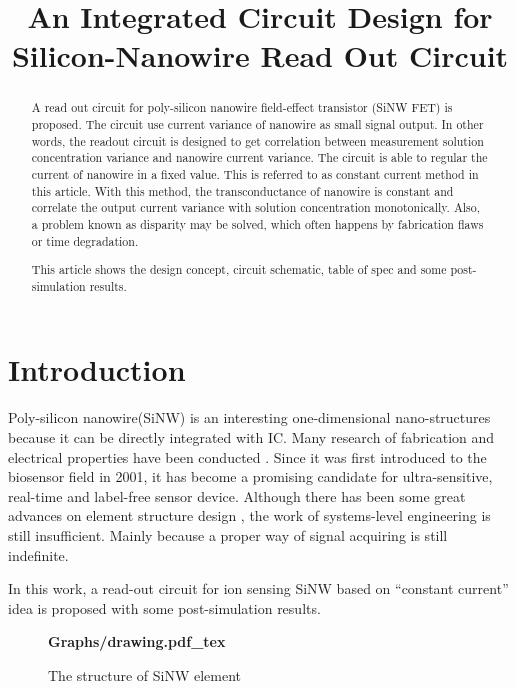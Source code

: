 \documentclass{article}
\title{An Integrated Circuit Design for Silicon-Nanowire Read Out Circuit}
\begin{document}
%
\maketitle
%
\begin{abstract}
A read out circuit for poly-silicon nanowire field-effect transistor (SiNW FET) is proposed. The circuit use current variance of nanowire as small signal output. In other words, the readout circuit is designed to get correlation between measurement solution concentration variance and nanowire current variance.
The circuit is able to regular the current of nanowire in a fixed value.
This is referred to as constant current method in this article.
With this method, the transconductance of nanowire is constant and correlate the output current variance with solution concentration monotonically.
Also, a problem known as disparity may be solved, which often happens by fabrication flaws or time degradation.

This article shows the design concept, circuit schematic, table of spec and some post-simulation results.
\end{abstract}
%
\section{Introduction}
\label{sec:intro}

Poly-silicon nanowire(SiNW) is an interesting one-dimensional nano-structures because it can be directly integrated with IC.
Many research of fabrication and electrical properties have been conducted \cite{J1}.
Since it was first introduced to the biosensor field in 2001\cite{J2}, it has become a promising candidate for ultra-sensitive, real-time and label-free  sensor device.
Although there has been some great advances on element structure design \cite{J3}, the work of systems-level engineering is still insufficient.
Mainly because a proper way of signal acquiring is still indefinite.

In this work, a read-out circuit for ion sensing SiNW based on “constant current” idea is proposed with some post-simulation results.



\begin{figure}[b]
    \centering
    {\selectfont \textbf{
        \def\svgwidth{5.0cm}
        \fontsize{6}{7}\selectfont
         {Graphs/drawing.pdf_tex}
        \fontsize{12}{15}\selectfont
    }}
\caption{The structure of SiNW element}
\label{fig:res}
\end{figure}
\end{document}
